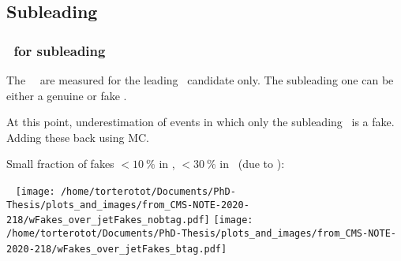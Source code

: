 \begin{frame}
\begin{minipage}[c]{.45\textwidth}
\begin{center}
\end{center}
\end{minipage}

\end{frame}

\subsection*{Subleading \ftauh}
\begin{frame}
\frametitle{\Fakefactors\ for subleading \tauh}

\manip The \tauh\tauh\ \fakefactors\ are measured for the leading \tauh\ candidate only.
\submanip The subleading one can be either a genuine or fake \tauh.

\manip At this point, underestimation of events in which only the subleading \tauh\ is a fake.
\submanip Adding these back using MC.

\manip Small fraction of fakes $<\SI{10}{\%}$ in \CATnobtag, $<\SI{30}{\%}$ in \CATbtag\ (due to \ttbar):

~\hfill
\texttt{[image: /home/torterotot/Documents/PhD-Thesis/plots\_and\_images/from\_CMS-NOTE-2020-218/wFakes\_over\_jetFakes\_nobtag.pdf]}
\hfill
\texttt{[image: /home/torterotot/Documents/PhD-Thesis/plots\_and\_images/from\_CMS-NOTE-2020-218/wFakes\_over\_jetFakes\_btag.pdf]}
\hfill~

\vspace{-5pt}


\end{frame}


